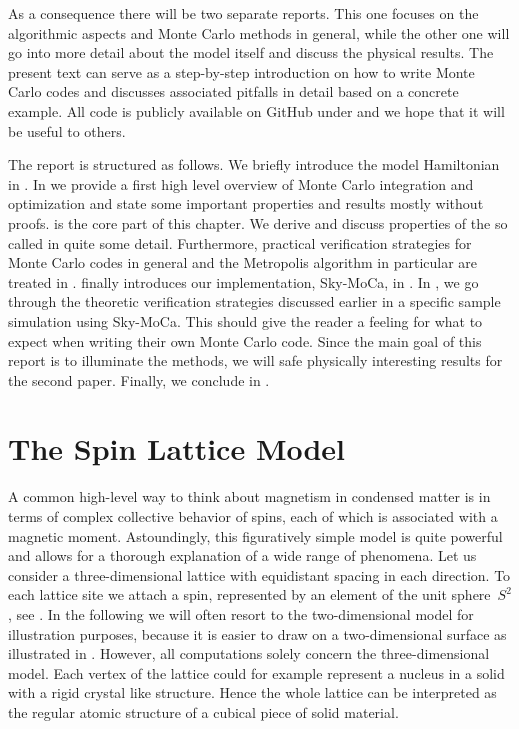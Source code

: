 As a consequence there will be two separate reports. This one focuses on the
algorithmic aspects and Monte Carlo methods in general, while the other one will
go into more detail about the model itself and discuss the physical results. The
present text can serve as a step-by-step introduction on how to write Monte
Carlo codes and discusses associated pitfalls in detail based on a concrete
example. All code is publicly available on GitHub under  and we hope
that it will be useful to others.

The report is structured as follows. We briefly introduce the model Hamiltonian
in . In  we provide a first high level
overview of Monte Carlo integration and optimization and state some important
properties and results mostly without proofs.  is the
core part of this chapter. We derive and discuss properties of the so called
 in quite some detail. Furthermore, practical
verification strategies for Monte Carlo codes in general and the Metropolis
algorithm in particular are treated in .  
finally introduces our implementation, Sky-MoCa, in . In
, we go through the theoretic verification strategies
discussed earlier in a specific sample simulation using Sky-MoCa. This should
give the reader a feeling for what to expect when writing their own Monte Carlo
code. Since the main goal of this report is to illuminate the methods, we will
safe physically interesting results for the second paper. Finally, we conclude
in .
%
\section{The Spin Lattice Model}\label{sec:model}
%
A common high-level way to think about magnetism in condensed matter is in terms
of complex collective behavior of spins, each of which is associated with a
magnetic moment. Astoundingly, this figuratively simple model is quite powerful
and allows for a thorough explanation of a wide range of phenomena. Let us
consider a three-dimensional lattice with equidistant spacing in each direction.
To each lattice site we attach a spin, represented by an element of the unit
sphere~$S^2$, see . In the following we will often resort to the
two-dimensional model for illustration purposes, because it is easier to draw on
a two-dimensional surface as illustrated in . However, all
computations solely concern the three-dimensional model. Each vertex of the
lattice could for example represent a nucleus in a solid with a rigid crystal
like structure. Hence the whole lattice can be interpreted as the regular atomic
structure of a cubical piece of solid material.

